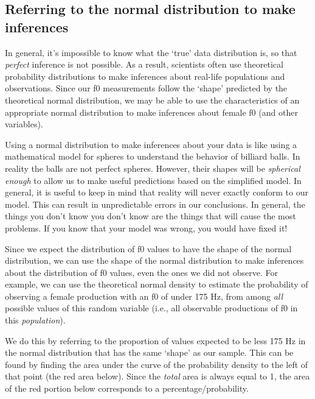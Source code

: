 \documentclass[
]{book}
\begin{document}
\hypertarget{referring-to-the-normal-distribution-to-make-inferences}{%
\subsection{Referring to the normal distribution to make inferences}\label{referring-to-the-normal-distribution-to-make-inferences}}

In general, it's impossible to know what the `true' data distribution is, so that \emph{perfect} inference is not possible. As a result, scientists often use theoretical probability distributions to make inferences about real-life populations and observations. Since our f0 measurements follow the `shape' predicted by the theoretical normal distribution, we may be able to use the characteristics of an appropriate normal distribution to make inferences about female f0 (and other variables).

Using a normal distribution to make inferences about your data is like using a mathematical model for spheres to understand the behavior of billiard balls. In reality the balls are not perfect spheres. However, their shapes will be \emph{spherical enough} to allow us to make useful predictions based on the simplified model. In general, it is useful to keep in mind that reality will never exactly conform to our model. This can result in unpredictable errors in our conclusions. In general, the things you don't know you don't know are the things that will cause the most problems. If you know that your model was wrong, you would have fixed it!

Since we expect the distribution of f0 values to have the shape of the normal distribution, we can use the shape of the normal distribution to make inferences about the distribution of f0 values, even the ones we did not observe. For example, we can use the theoretical normal density to estimate the probability of observing a female production with an f0 of under 175 Hz, from among \emph{all} possible values of this random variable (i.e., all observable productions of f0 in this \emph{population}).

We do this by referring to the proportion of values expected to be less 175 Hz in the normal distribution that has the same `shape' as our sample. This can be found by finding the area under the curve of the probability density to the left of that point (the red area below). Since the \emph{total} area is always equal to 1, the area of the red portion below corresponds to a percentage/probability.
\end{document}
